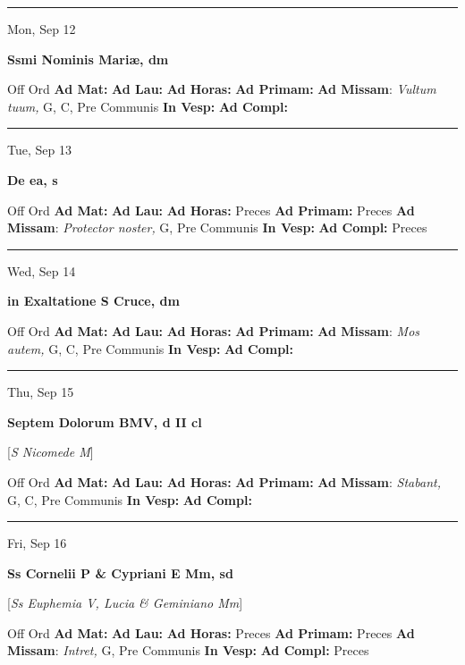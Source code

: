 \documentclass[letterpaper, 10pt]{article}
\begin{document}
\hrule
\begin{center}
Mon, Sep 12
\end{center}\textbf{ \large Ssmi Nominis Mariæ, \textnormal{\normalsize dm}}
\begin{justify}
Off Ord
\textbf{Ad Mat: }
\textbf{Ad Lau: }
\textbf{Ad Horas: }
\textbf{Ad Primam: }
\textbf{Ad Missam}: \textit{Vultum tuum,} G, C, Pre Communis
\textbf{In Vesp: }
\textbf{Ad Compl: }\end{justify}



\hrule
\begin{center}
Tue, Sep 13
\end{center}\textbf{ \large De ea, \textnormal{\normalsize s}}
\begin{justify}
Off Ord
\textbf{Ad Mat: }
\textbf{Ad Lau: }
\textbf{Ad Horas: }Preces
\textbf{Ad Primam: }Preces
\textbf{Ad Missam}: \textit{Protector noster,} G, Pre Communis
\textbf{In Vesp: }
\textbf{Ad Compl: }Preces\end{justify}



\hrule
\begin{center}
Wed, Sep 14
\end{center}\textbf{ \large in Exaltatione S Cruce, \textnormal{\normalsize dm}}
\begin{justify}
Off Ord
\textbf{Ad Mat: }
\textbf{Ad Lau: }
\textbf{Ad Horas: }
\textbf{Ad Primam: }
\textbf{Ad Missam}: \textit{Mos autem,} G, C, Pre Communis
\textbf{In Vesp: }
\textbf{Ad Compl: }\end{justify}



\hrule
\begin{center}
Thu, Sep 15
\end{center}\textbf{ \large Septem Dolorum BMV, \textnormal{\normalsize d II cl}}

[\textit{S Nicomede M}]
\begin{justify}
Off Ord
\textbf{Ad Mat: }
\textbf{Ad Lau: }
\textbf{Ad Horas: }
\textbf{Ad Primam: }
\textbf{Ad Missam}: \textit{Stabant,} G, C, Pre Communis
\textbf{In Vesp: }
\textbf{Ad Compl: }\end{justify}



\hrule
\begin{center}
Fri, Sep 16
\end{center}\textbf{ \large Ss Cornelii P \& Cypriani E Mm, \textnormal{\normalsize sd}}

[\textit{Ss Euphemia V, Lucia \& Geminiano Mm}]
\begin{justify}
Off Ord
\textbf{Ad Mat: }
\textbf{Ad Lau: }
\textbf{Ad Horas: }Preces
\textbf{Ad Primam: }Preces
\textbf{Ad Missam}: \textit{Intret,} G, Pre Communis
\textbf{In Vesp: }
\textbf{Ad Compl: }Preces\end{justify}
\end{document}

